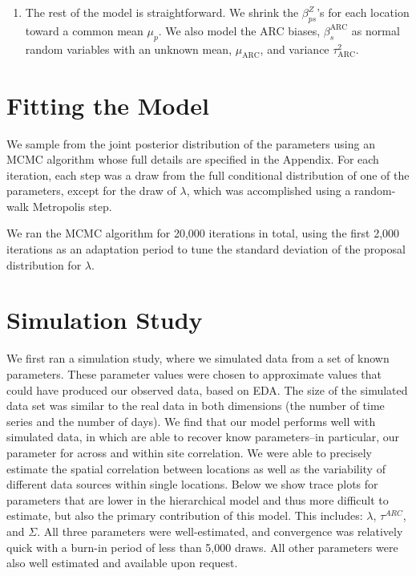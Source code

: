 \documentclass[11pt]{article}
\begin{document}
\begin{enumerate}
\item The rest of the model is straightforward. We shrink the $\beta_{ps}^Z$'s for each location toward a common mean $\mu_p$. We also model the ARC biases, $\beta^\text{ARC}_s$ as normal random variables with an unknown mean, $\mu_\text{ARC}$, and variance $\tau_\text{ARC}^2$.
\end{enumerate}



\section{Fitting the Model}\label{sec:fit}

We sample from the joint posterior distribution of the parameters using an MCMC algorithm whose full details are specified in the Appendix. For each iteration, each step was a draw from the full conditional distribution of one of the parameters, except for the draw of $\lambda$, which was accomplished using a random-walk Metropolis step.

We ran the MCMC algorithm for 20,000 iterations in total, using the first 2,000 iterations as an adaptation period to tune the standard deviation of the proposal distribution for $\lambda$. 


\section{Simulation Study}
\label{sec:sim}
We first ran a simulation study, where we simulated data from a set of known parameters. These parameter values were chosen to approximate values that could have produced our observed data, based on EDA. The size of the simulated data set was similar to the real data in both dimensions (the number of time series and the number of days). We find that our model performs well with simulated data, in which are able to recover know parameters--in particular, our parameter for across and within site correlation. We were able to precisely estimate the spatial correlation between locations as well as the variability of different data sources within single locations. Below we show trace plots for parameters that are lower in the hierarchical model and thus more difficult to estimate, but also the primary contribution of this model. This includes: $\lambda$, $\tau^{ARC}$, and $\Sigma$. All three parameters were well-estimated, and convergence was relatively quick with a burn-in period of less than 5,000 draws. All other parameters were also well estimated and available upon request. 
\end{document}
